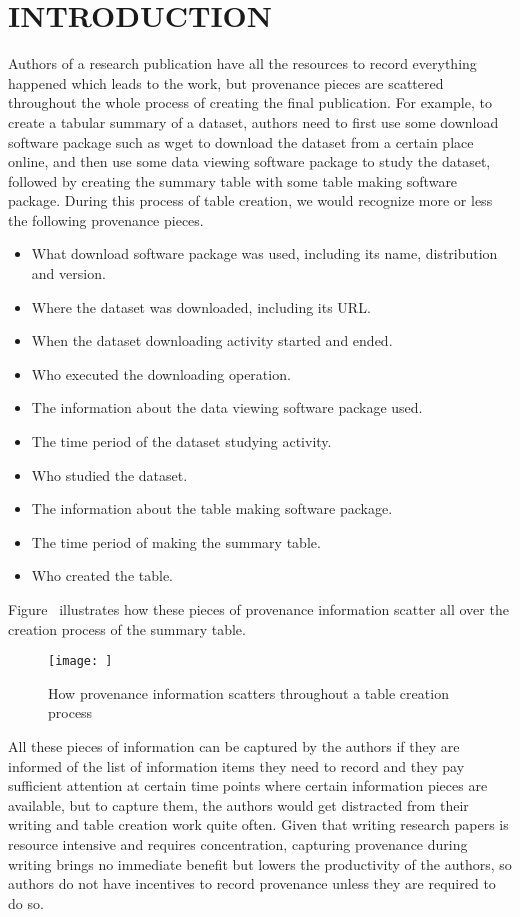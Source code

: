  
\chapter{INTRODUCTION}
Authors of a research publication have all the resources to record everything happened which leads to the work, but provenance pieces are scattered throughout the whole process of creating the final publication. For example, to create a tabular summary of a dataset, authors need to first use some download software package such as wget to download the dataset from a certain place online, and then use some data viewing software package to study the dataset, followed by creating the summary table with some table making software package. During this process of table creation, we would recognize more or less the following provenance pieces.
\begin{itemize}
\item What download software package was used, including its name, distribution and version.
\item Where the dataset was downloaded, including its URL.
\item When the dataset downloading activity started and ended.
\item Who executed the downloading operation.
\item The information about the data viewing software package used.
\item The time period of the dataset studying activity.
\item Who studied the dataset.
\item The information about the table making software package.
\item The time period of making the summary table.
\item Who created the table.
\end{itemize}
Figure~\cite{prov-pieces} illustrates how these pieces of provenance information scatter all over the creation process of the summary table.
\begin{figure}
\centering
\texttt{[image: ]}
\caption{How provenance information scatters throughout a table creation process}
\end{figure}
All these pieces of information can be captured by the authors if they are informed of the list of information items they need to record and they pay sufficient attention at certain time points where certain information pieces are available, but to capture them, the authors would get distracted from their writing and table creation work quite often. Given that writing research papers is resource intensive and requires concentration, capturing provenance during writing brings no immediate benefit but lowers the productivity of the authors, so authors do not have incentives to record provenance unless they are required to do so.

